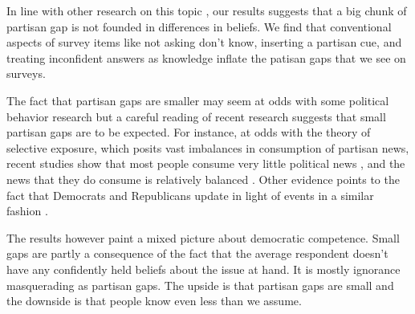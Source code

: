 \documentclass[12pt, letterpaper]{article}
\begin{document}
In line with other research on this topic \citep[][though see \citeauthor{berinsky_2017} \citeyear{berinsky_2017} and \citeauthor{peterson_iyengar_forth} \citeyear{peterson_iyengar_forth}]{bullocketal_2015, prior2015you, schaffner_luks}, our results suggests that a big chunk of partisan gap is not founded in differences in beliefs. We find that conventional aspects of survey items like not asking don't know, inserting a partisan cue, and treating inconfident answers as knowledge inflate the patisan gaps that we see on surveys.

The fact that partisan gaps are smaller may seem at odds with some political behavior research but a careful reading of recent research suggests that small partisan gaps are to be expected. For instance, at odds with the theory of selective exposure, which posits vast imbalances in consumption of partisan news, recent studies show that most people consume very little political news \citep{Prior2007,flaxmanetal_2016}, and the news that they do consume is relatively balanced \citep{flaxmanetal_2016,garzetal_2018,gentzkowshapiro_2011,guess_2020}. Other evidence points to the fact that Democrats and Republicans update in light of events in a similar fashion \citep{gerber_annual_review,kernell_2019}.

The results however paint a mixed picture about democratic competence. Small gaps are partly a consequence of the fact that the average respondent doesn't have any confidently held beliefs about the issue at hand. It is mostly ignorance masquerading as partisan gaps. The upside is that partisan gaps are small and the downside is that people know even less than we assume.

\clearpage



\clearpage


\end{document}
